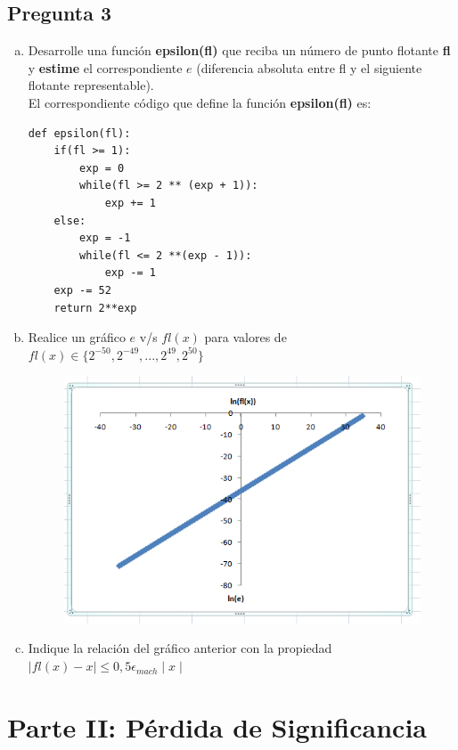 \documentclass[10pt]{article}
\begin{document}
\subsection{Pregunta 3}
\begin{enumerate}[a)]
\item Desarrolle una función \textbf{epsilon(fl)} que reciba un número de punto flotante \textbf{fl} y \textbf{estime} el correspondiente $e$ (diferencia absoluta entre fl y el siguiente flotante representable).\\
El correspondiente código que define la función \textbf{epsilon(fl)} es:
\begin{verbatim}
def epsilon(fl):
	if(fl >= 1):
		exp = 0
		while(fl >= 2 ** (exp + 1)):
			exp += 1
	else:
		exp = -1
		while(fl <= 2 **(exp - 1)):
			exp -= 1
	exp -= 52
	return 2**exp
\end{verbatim}

\item Realice un gráfico $e$ v/s $fl(x)$ para valores de $fl(x) \in \{2^{-50}, 2^{-49}, ..., 2^{49}, 2^{50}\}$

\begin{figure}[h]
\includegraphics[width=\textwidth]{grafico}
\end{figure}

\item Indique la relación del gráfico anterior con la propiedad \\
$\mid fl(x)-x \mid \leq 0,5 \epsilon_{mach} \mid x \mid$
\end{enumerate}

\section{Parte II: Pérdida de Significancia}
\end{document}
